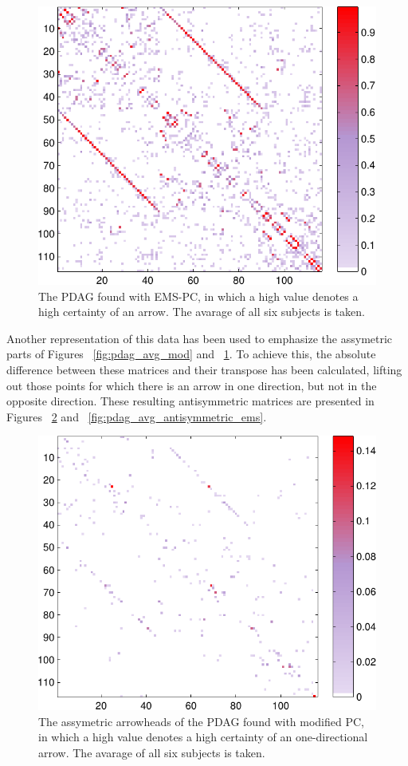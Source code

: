 \documentclass[a4paper, 10pt, english, onecolumn]{article}
\begin{document}
\begin{figure}[h!]
  \centering
  \includegraphics{images/PDAG_avg_colored_expl}
  \caption{The PDAG found with EMS-PC, in which a high value denotes a high certainty of an arrow. The avarage of all six subjects is taken.}
  \label{fig:pdag_avg_ems}
\end{figure}

Another representation of this data has been used to emphasize the assymetric parts of Figures ~\ref{fig:pdag_avg_mod} and ~\ref{fig:pdag_avg_ems}.
To achieve this, the absolute difference between these matrices and their transpose has been calculated, lifting out those points for which there is an arrow in one direction, but not in the opposite direction.
These resulting antisymmetric matrices are presented in Figures ~\ref{fig:pdag_avg_antisymmetric_mod} and ~\ref{fig:pdag_avg_antisymmetric_ems}.

\begin{figure}[h!]
  \centering
  \includegraphics{images/arrowheads_avg_mod}
  \caption{The assymetric arrowheads of the PDAG found with modified PC, in which a high value denotes a high certainty of an one-directional arrow. The avarage of all six subjects is taken.}
  \label{fig:pdag_avg_antisymmetric_mod}
\end{figure}
\end{document}
